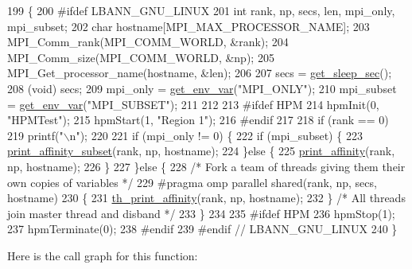 \begin{DoxyCode}
199 \{
200 \textcolor{preprocessor}{#ifdef LBANN\_GNU\_LINUX}
201   \textcolor{keywordtype}{int} rank, np, secs, len, mpi\_only, mpi\_subset;
202   \textcolor{keywordtype}{char} hostname[MPI\_MAX\_PROCESSOR\_NAME];
203   MPI\_Comm\_rank(MPI\_COMM\_WORLD, &rank);
204   MPI\_Comm\_size(MPI\_COMM\_WORLD, &np);
205   MPI\_Get\_processor\_name(hostname, &len);
206 
207   secs = \hyperlink{namespacelbann_a17d55032bad5bb02903f9b1d933836a4}{get\_sleep\_sec}();
208   (void) secs;
209   mpi\_only = \hyperlink{namespacelbann_aa4ee6571e54db5cee7f263029147e5f2}{get\_env\_var}(\textcolor{stringliteral}{"MPI\_ONLY"});
210   mpi\_subset = \hyperlink{namespacelbann_aa4ee6571e54db5cee7f263029147e5f2}{get\_env\_var}(\textcolor{stringliteral}{"MPI\_SUBSET"});
211 
212 
213 \textcolor{preprocessor}{  #ifdef HPM}
214     hpmInit(0, \textcolor{stringliteral}{"HPMTest"});
215     hpmStart(1, \textcolor{stringliteral}{"Region 1"});
216 \textcolor{preprocessor}{  #endif}
217 
218   \textcolor{keywordflow}{if} (rank == 0)
219     printf(\textcolor{stringliteral}{"\(\backslash\)n"});
220 
221   \textcolor{keywordflow}{if} (mpi\_only != 0) \{
222     \textcolor{keywordflow}{if} (mpi\_subset) \{
223       \hyperlink{namespacelbann_acbd15ead7411cf84db559cc39a82f445}{print\_affinity\_subset}(rank, np, hostname);
224     \}\textcolor{keywordflow}{else} \{
225       \hyperlink{namespacelbann_a4fd83a86cf27ca7bc1e01576a5ee36e0}{print\_affinity}(rank, np, hostname);
226     \}
227   \}\textcolor{keywordflow}{else} \{
228     \textcolor{comment}{/* Fork a team of threads giving them their own copies of variables */}
229 \textcolor{preprocessor}{#pragma omp parallel shared(rank, np, secs, hostname)}
230     \{
231       \hyperlink{namespacelbann_a31acedf53bb67180043939832c0220d3}{th\_print\_affinity}(rank, np, hostname);
232     \}  \textcolor{comment}{/* All threads join master thread and disband */}
233   \}
234 
235 \textcolor{preprocessor}{#ifdef HPM}
236   hpmStop(1);
237   hpmTerminate(0);
238 \textcolor{preprocessor}{#endif}
239 \textcolor{preprocessor}{#endif // LBANN\_GNU\_LINUX}
240 \}
\end{DoxyCode}
Here is the call graph for this function\+:\nopagebreak
